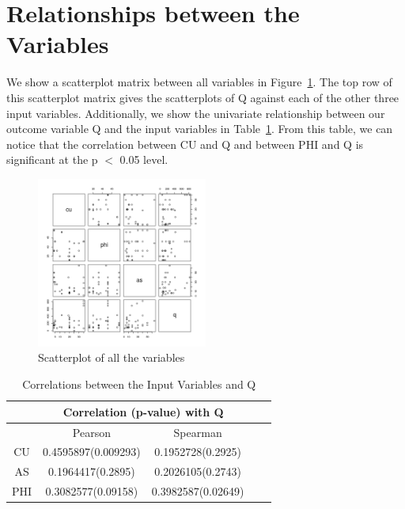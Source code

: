 \documentclass[a4paper,12pt, english]{article}
\begin{document}
\section{Relationships between the Variables}
We show a scatterplot matrix between all variables in Figure~\ref{fig:pairs}. The top row of this scatterplot matrix gives the scatterplots of Q against each of the other three input variables. Additionally, we show the univariate relationship between our outcome variable Q and the input variables in Table~\ref{table:corr-q}. From this table, we can notice that the correlation between CU and Q and between PHI and Q is significant at the p $<$ 0.05 level.
\begin{figure}[!htbp]
  \centering
  \includegraphics[width=0.5\textwidth]{pairs}
  \caption{Scatterplot of all the variables}
  \label{fig:pairs}
\end{figure}


\begin{table}[!htbp]
\centering

\begin{tabular}{*5c}
\toprule
&  \multicolumn{2}{c}{Correlation (p-value) with Q} \\
\midrule
{}   & Pearson   & Spearman    \\
CU & 0.4595897(0.009293) & 0.1952728(0.2925)   \\
AS   & 0.1964417(0.2895)   & 0.2026105(0.2743)  \\
PHI & 0.3082577(0.09158)  & 0.3982587(0.02649)  \\
\bottomrule
\end{tabular}
\caption{Correlations between the Input Variables and Q}
\label{table:corr-q}
\end{table}
\end{document}
